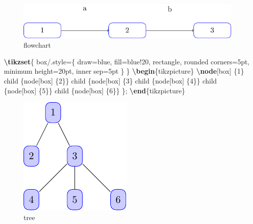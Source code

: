 \documentclass[
]{book}
\newenvironment{Shaded}{\begin{snugshade}}{\end{snugshade}}
\newcommand{\ExtensionTok}[1]{#1}
\newcommand{\FunctionTok}[1]{\textcolor[rgb]{0.13,0.29,0.53}{\textbf{#1}}}
\newcommand{\KeywordTok}[1]{\textcolor[rgb]{0.13,0.29,0.53}{\textbf{#1}}}
\newcommand{\NormalTok}[1]{#1}
\theoremstyle{definition}
\theoremstyle{definition}
\theoremstyle{definition}
\theoremstyle{definition}
\theoremstyle{remark}
\begin{document}
\begin{figure}
\includegraphics[width=0.75\linewidth]{202401311000-TikZ_files/figure-latex/unnamed-chunk-55-1} \caption{flowchart}\label{fig:unnamed-chunk-55}
\end{figure}

\begin{Shaded}
\begin{Highlighting}[]
\FunctionTok{\textbackslash{}tikzset}\NormalTok{\{}
\NormalTok{  box/.style=\{}
\NormalTok{    draw=blue,}
\NormalTok{    fill=blue!20,}
\NormalTok{    rectangle,}
\NormalTok{    rounded corners=5pt,}
\NormalTok{    minimum height=20pt,}
\NormalTok{    inner sep=5pt}
\NormalTok{  \}}
\NormalTok{\}}
\KeywordTok{\textbackslash{}begin}\NormalTok{\{}\ExtensionTok{tikzpicture}\NormalTok{\}}
  \FunctionTok{\textbackslash{}node}\NormalTok{[box] \{1\}}
\NormalTok{      child \{node[box] \{2\}\}}
\NormalTok{      child \{node[box] \{3\}}
\NormalTok{          child \{node[box] \{4\}\}}
\NormalTok{          child \{node[box] \{5\}\}}
\NormalTok{          child \{node[box] \{6\}\}}
\NormalTok{      \};}
\KeywordTok{\textbackslash{}end}\NormalTok{\{}\ExtensionTok{tikzpicture}\NormalTok{\}}
\end{Highlighting}
\end{Shaded}

\begin{figure}
\includegraphics[width=0.75\linewidth]{202401311000-TikZ_files/figure-latex/unnamed-chunk-57-1} \caption{tree}\label{fig:unnamed-chunk-57}
\end{figure}
\end{document}
